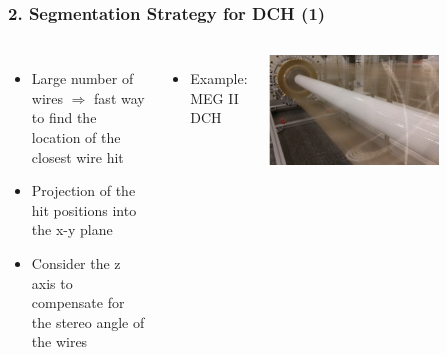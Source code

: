\documentclass[aspectratio=169, hyperref={colorlinks=true,pdfpagelabels=false,linkcolor=black}, xcolor=dvipsnames,10pt]{beamer}
\begin{document}
\begin{frame}
  \frametitle{2. Segmentation Strategy for DCH (1)}

	\vspace{1cm}
	
	\begin{columns}[t]
	\begin{itemize}
    \item Large number of wires $\Rightarrow$ fast way to find the
      location of the closest wire hit
    \item Projection of the hit positions into the x-y plane
    \item Consider the z axis to compensate for the stereo angle of the wires
    \end{itemize}
    
	\centering
	\begin{itemize}
	\item Example: MEG II DCH
	\end{itemize}
	\includegraphics[width=0.7\textwidth]{../figures/MEGDCH.png}
    \end{columns}
	
	\vspace{-0.5cm}
    \begin{columns}
\end{columns}
\end{frame}
\end{document}
